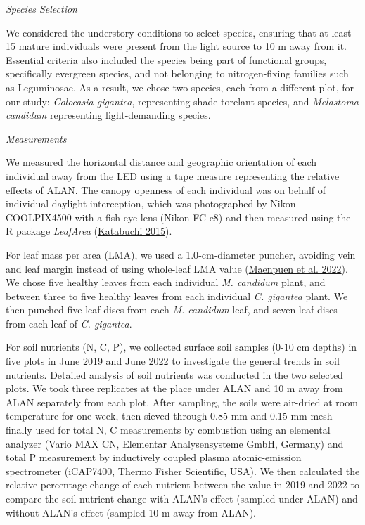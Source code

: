 \documentclass[
  12pt,
  letterpaper,
  DIV=11,
  numbers=noendperiod]{scrartcl}
\begin{document}
\emph{Species Selection}

We considered the understory conditions to select species, ensuring that
at least 15 mature individuals were present from the light source to 10
m away from it. Essential criteria also included the species being part
of functional groups, specifically evergreen species, and not belonging
to nitrogen-fixing families such as Leguminosae. As a result, we chose
two species, each from a different plot, for our study: \emph{Colocasia
gigantea}, representing shade-torelant species, and \emph{Melastoma
candidum} representing light-demanding species.

\emph{Measurements}

We measured the horizontal distance and geographic orientation of each
individual away from the LED using a tape measure representing the
relative effects of ALAN. The canopy openness of each individual was on
behalf of individual daylight interception, which was photographed by
Nikon COOLPIX4500 with a fish-eye lens (Nikon FC-e8) and then measured
using the R package \emph{LeafArea}
(\protect\hyperlink{ref-Katabuchi2015}{Katabuchi 2015}).

For leaf mass per area (LMA), we used a 1.0‐cm‐diameter puncher,
avoiding vein and leaf margin instead of using whole-leaf LMA value
(\protect\hyperlink{ref-Maenpuen2022}{Maenpuen et al. 2022}). We chose
five healthy leaves from each individual \emph{M. candidum} plant, and
between three to five healthy leaves from each individual \emph{C.
gigantea} plant. We then punched five leaf discs from each \emph{M.
candidum} leaf, and seven leaf discs from each leaf of \emph{C.
gigantea}.

For soil nutrients (N, C, P), we collected surface soil samples (0-10 cm
depths) in five plots in June 2019 and June 2022 to investigate the
general trends in soil nutrients. Detailed analysis of soil nutrients
was conducted in the two selected plots. We took three replicates at the
place under ALAN and 10 m away from ALAN separately from each plot.
After sampling, the soils were air-dried at room temperature for one
week, then sieved through 0.85-mm and 0.15-mm mesh finally used for
total N, C measurements by combustion using an elemental analyzer (Vario
MAX CN, Elementar Analysensysteme GmbH, Germany) and total P measurement
by inductively coupled plasma atomic-emission spectrometer (iCAP7400,
Thermo Fisher Scientific, USA). We then calculated the relative
percentage change of each nutrient between the value in 2019 and 2022 to
compare the soil nutrient change with ALAN's effect (sampled under ALAN)
and without ALAN's effect (sampled 10 m away from ALAN).
\end{document}
